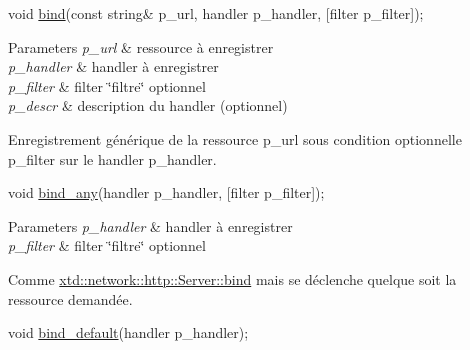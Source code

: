 \begin{DoxyItemize}
\item 
\begin{DoxyCode}
\textcolor{keywordtype}{void} \hyperlink{classxtd_1_1network_1_1http_1_1Server_a7281ae7cdda6d7b2334b27e530ce000f}{bind}(\textcolor{keyword}{const} \textcolor{keywordtype}{string}& p\_url, handler p\_handler, [filter p\_filter]); 
\end{DoxyCode}
 
\begin{DoxyParams}{Parameters}
{\em p\-\_\-url} & ressource à enregistrer \\
\hline
{\em p\-\_\-handler} & handler à enregistrer \\
\hline
{\em p\-\_\-filter} & filter \char`\"{}filtre\char`\"{} optionnel \\
\hline
{\em p\-\_\-descr} & description du handler (optionnel)\\
\hline
\end{DoxyParams}
Enregistrement générique de la ressource p\-\_\-url sous condition optionnelle p\-\_\-filter sur le handler p\-\_\-handler. \par
\par

\item 
\begin{DoxyCode}
\textcolor{keywordtype}{void} \hyperlink{classxtd_1_1network_1_1http_1_1Server_a8a14495899a4a6a4287597d8c7cc808a}{bind\_any}(handler p\_handler, [filter p\_filter]); 
\end{DoxyCode}
 \par
\par
 
\begin{DoxyParams}{Parameters}
{\em p\-\_\-handler} & handler à enregistrer \\
\hline
{\em p\-\_\-filter} & filter \char`\"{}filtre\char`\"{} optionnel\\
\hline
\end{DoxyParams}
Comme \hyperlink{classxtd_1_1network_1_1http_1_1Server_a7281ae7cdda6d7b2334b27e530ce000f}{xtd\-::network\-::http\-::\-Server\-::bind} mais se déclenche quelque soit la ressource demandée. \par
\par

\item 
\begin{DoxyCode}
\textcolor{keywordtype}{void} \hyperlink{classxtd_1_1network_1_1http_1_1Server_ac5121491ca4ae4f9c062e513b1a8e507}{bind\_default}(handler p\_handler); 
\end{DoxyCode}
 \par
\par
 

\end{DoxyItemize}

